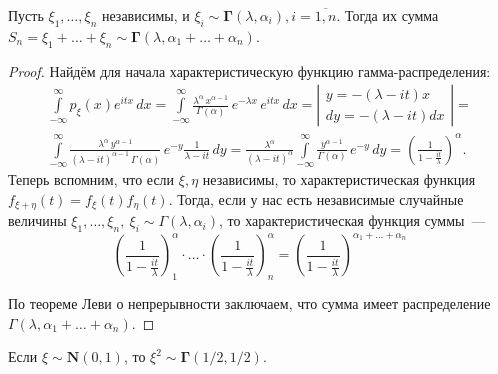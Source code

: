 \begin{lem}
    Пусть $\xi_{1}, \ldots, \xi_{n}$ независимы, и $\xi_i \sim \mathbf{\Gamma}(\lambda, \alpha_i), i=\overline{1,n}$. 
    Тогда их сумма $S_{n}=\xi_{1}+\ldots+\xi_{n} \sim \mathbf{\Gamma}(\lambda, \alpha_1 + \ldots + \alpha_n)$.
\end{lem}
\begin{proof}
    Найдём для начала характеристическую функцию гамма-распределения:
    \begin{multline*}
        \int\limits_{-\infty}^{\infty} p_{\xi}(x) e^{itx} \, dx = 
        \int\limits_{-\infty}^{\infty} \frac{\lambda^\alpha \, x^{\alpha - 1}}{\Gamma(\alpha)} \, e^{-\lambda x}\, e^{itx} \,dx = 
        \left| \begin{array}{c}
            y  = -(\lambda - it)x \\
            dy = -(\lambda - it)dx
        \end{array} \right| = \\
        \int\limits_{-\infty}^{\infty} \frac{\lambda^\alpha \, y^{\alpha - 1}}{(\lambda - it)^{\alpha - 1} \, \Gamma(\alpha)} \, e^{-y} \frac{1}{\lambda - it} \,dy = 
        \frac{\lambda^\alpha}{(\lambda - it)^{\alpha}} \int\limits_{-\infty}^{\infty} \frac{y^{\alpha - 1}}{\Gamma(\alpha)} \, e^{-y} \, dy = 
        \left(\frac{1}{1 - \frac{it}{\lambda}} \right)^\alpha \!.
    \end{multline*}
    Теперь вспомним, что если $\xi, \eta$ независимы, то характеристическая функция $f_{\xi + \eta}(t) = f_{\xi}(t) f_{\eta}(t)$.
    Тогда, если у нас есть независимые случайные величины $\xi_1, \ldots, \xi_n, \: \xi_i \sim \Gamma(\lambda, \alpha_i)$, 
    то характеристическая функция суммы~---
    \begin{equation*}
        \left(\frac{1}{1 - \frac{it}{\lambda}} \right)^\alpha_1 \cdot \ldots \cdot \left(\frac{1}{1 - \frac{it}{\lambda}} \right)^\alpha_n = 
        \left(\frac{1}{1 - \frac{it}{\lambda}} \right)^{\alpha_1 + \ldots + \alpha_n}
    \end{equation*}

    По теореме Леви о непрерывности заключаем, что сумма имеет распределение $\Gamma(\lambda, \alpha_1 + \ldots + \alpha_n)$.
\end{proof}

\begin{lem}
    Если $\xi \sim \mathbf{N}(0,1)$, то $\xi^2 \sim \mathbf{\Gamma}(1/2, 1/2)$.
\end{lem}

